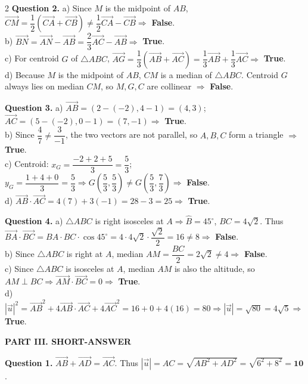 \documentclass[10pt,a4paper]{article}
\begin{document}
\begin{multicols}{2}
\textbf{Question 2.}
a) Since $M$ is the midpoint of $AB$, $\vec{CM} = \dfrac{1}{2}(\vec{CA} + \vec{CB}) \ne \dfrac{1}{2}\vec{CA} - \vec{CB} \Rightarrow$ \textbf{False}.\\
b) $\vec{BN} = \vec{AN} - \vec{AB} = \dfrac{2}{3}\vec{AC} - \vec{AB} \Rightarrow$ \textbf{True}.\\
c) For centroid $G$ of $\triangle ABC$, $\vec{AG} = \dfrac{1}{3}(\vec{AB} + \vec{AC}) = \dfrac{1}{3}\vec{AB} + \dfrac{1}{3}\vec{AC} \Rightarrow$ \textbf{True}.\\
d) Because $M$ is the midpoint of $AB$, $CM$ is a median of $\triangle ABC$. Centroid $G$ always lies on median $CM$, so $M, G, C$ are collinear $\Rightarrow$ \textbf{False}.

\textbf{Question 3.}
a) $\vec{AB} = (2 - (-2), 4 - 1) = (4, 3)$; $\vec{AC} = (5 - (-2), 0 - 1) = (7, -1) \Rightarrow$ \textbf{True}.\\
b) Since $\dfrac{4}{7} \ne \dfrac{3}{-1}$, the two vectors are not parallel, so $A, B, C$ form a triangle $\Rightarrow$ \textbf{True}.\\
c) Centroid: $x_G = \dfrac{-2+2+5}{3} = \dfrac{5}{3}$; $y_G = \dfrac{1+4+0}{3} = \dfrac{5}{3} \Rightarrow G\left(\dfrac{5}{3}, \dfrac{5}{3}\right) \ne G\left(\dfrac{5}{3}, \dfrac{7}{3}\right) \Rightarrow$ \textbf{False}.\\
d) $\vec{AB} \cdot \vec{AC} = 4(7) + 3(-1) = 28 - 3 = 25 \Rightarrow$ \textbf{True}.

\textbf{Question 4.}
a) $\triangle ABC$ is right isosceles at $A \Rightarrow \widehat{B} = 45^\circ$, $BC = 4\sqrt{2}$. Thus $\vec{BA} \cdot \vec{BC} = BA \cdot BC \cdot \cos 45^\circ = 4 \cdot 4\sqrt{2} \cdot \dfrac{\sqrt{2}}{2} = 16 \ne 8 \Rightarrow$ \textbf{False}.\\
b) Since $\triangle ABC$ is right at $A$, median $AM = \dfrac{BC}{2} = 2\sqrt{2} \ne 4 \Rightarrow$ \textbf{False}.\\
c) Since $\triangle ABC$ is isosceles at $A$, median $AM$ is also the altitude, so $AM \perp BC \Rightarrow \vec{AM} \cdot \vec{BC} = 0 \Rightarrow$ \textbf{True}.\\
d) $|\vec{u}|^2 = \vec{AB}^2 + 4\vec{AB}\cdot\vec{AC} + 4\vec{AC}^2 = 16 + 0 + 4(16) = 80 \Rightarrow |\vec{u}| = \sqrt{80} = 4\sqrt{5} \Rightarrow$ \textbf{True}.

\textbf{\color{accent}PART III. SHORT-ANSWER}

\textbf{Question 1.} $\vec{AB} + \vec{AD} = \vec{AC}$. Thus $|\vec{u}| = AC = \sqrt{AB^2 + AD^2} = \sqrt{6^2 + 8^2} = \mathbf{10}$.


\end{multicols}
\end{document}
